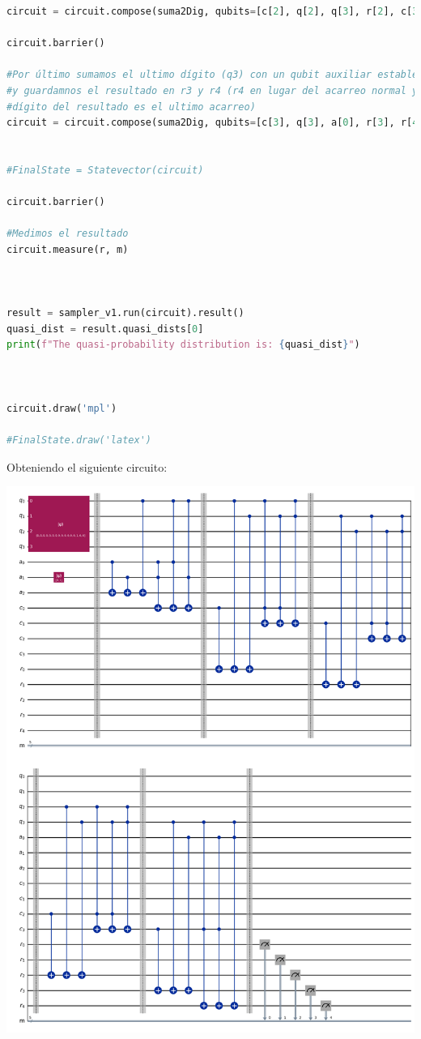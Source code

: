 \begin{lstlisting}[language=Python]
circuit = circuit.compose(suma2Dig, qubits=[c[2], q[2], q[3], r[2], c[3]])

circuit.barrier()

#Por último sumamos el ultimo dígito (q3) con un qubit auxiliar establecido en 0 (a0)
#y guardamnos el resultado en r3 y r4 (r4 en lugar del acarreo normal ya que el ultimo
#dígito del resultado es el ultimo acarreo)
circuit = circuit.compose(suma2Dig, qubits=[c[3], q[3], a[0], r[3], r[4]])


#FinalState = Statevector(circuit)

circuit.barrier()

#Medimos el resultado
circuit.measure(r, m)



result = sampler_v1.run(circuit).result()
quasi_dist = result.quasi_dists[0]
print(f"The quasi-probability distribution is: {quasi_dist}")



circuit.draw('mpl')

#FinalState.draw('latex')
\end{lstlisting}

Obteniendo el siguiente circuito:

\begin{center}
    \includegraphics[width=1\linewidth]{CircuitoTSinCompactarn=13.png}
    \label{fig:CircuitoTSinCompactarn=13}
\end{center}


